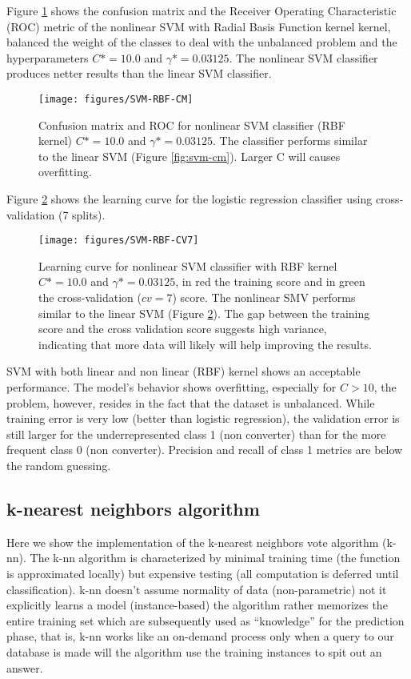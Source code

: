 \documentclass[11pt]{article}
\theoremstyle{definition}
\theoremstyle{remark}
\begin{document}
Figure \ref{fig:svm-rbf-cm} shows the confusion matrix and the Receiver Operating Characteristic (ROC) metric of the nonlinear SVM with Radial Basis Function kernel kernel, balanced the weight of the classes to deal with the unbalanced problem and the hyperparameters $C*= 10.0$ and $\gamma *= 0.03125$. The nonlinear SVM classifier produces netter results than the linear SVM classifier.

\begin{figure}[H]
        \centering
        \texttt{[image: figures/SVM-RBF-CM]}
        \caption{Confusion matrix and ROC for nonlinear SVM classifier (RBF kernel) $C*= 10.0$ and $\gamma *= 0.03125$. The classifier performs similar to the linear SVM (Figure \ref{fig:svm-cm}). Larger C will causes overfitting.} \label{fig:svm-rbf-cm}
\end{figure}

Figure \ref{fig:svm-cv7} shows the learning curve for the logistic regression classifier using cross-validation (7 splits).
\begin{figure}[H]
        \centering
        \texttt{[image: figures/SVM-RBF-CV7]}
        \caption{Learning curve for nonlinear SVM classifier with RBF kernel $C*= 10.0$ and $\gamma *= 0.03125$, in red the training score and in green the cross-validation ($cv=7$) score. The nonlinear SMV performs similar to the linear SVM (Figure \ref{fig:svm-cv7}). The gap between the training score and the cross validation score suggests high variance, indicating that more data will likely will help improving the results. 
        } \label{fig:svm-cv7}
\end{figure}

SVM with both linear and non linear (RBF) kernel shows an acceptable performance. 
The model's behavior shows overfitting, especially for $C>10$, the problem, however, resides in the fact that the dataset is  unbalanced. While training error is very low (better than logistic regression), the validation error is still larger for the underrepresented class 1 (non converter) than for the more frequent class 0 (non converter). Precision and recall of class 1 metrics are below the random guessing. 

\subsection{k-nearest neighbors algorithm}
\label{se:reskneighbors}
Here we show the implementation of the k-nearest neighbors vote algorithm (k-nn). The k-nn algorithm is characterized by minimal training time (the function is approximated locally) but expensive testing (all computation is deferred until classification).
k-nn doesn't assume normality of data (non-parametric) not it explicitly learns a model (instance-based) the algorithm rather memorizes the entire training set which are subsequently used as “knowledge” for the prediction phase, that is, k-nn works like an on-demand process only when a query to our database is made will the algorithm use the training instances to spit out an answer. 
\end{document}
